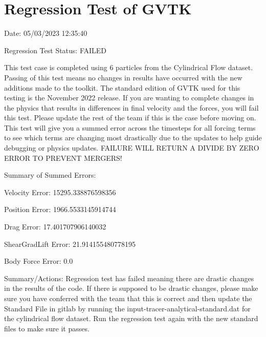 \documentclass{article}
\begin{document}
\section{Regression Test of GVTK}
Date: 05/03/2023 12:35:40

\vspace{5pt}

\noindent Regression Test Status: FAILED

\vspace{5pt}

\noindent This test case is completed using 6 particles from the Cylindrical Flow dataset. Passing of this test means no changes in results have occurred with the new additions made to the toolkit.
The standard edition of GVTK used for this testing is the November 2022 release. If you are wanting to complete changes in the physics that results in differences in final velocity and the forces,
you will fail this test. Please update the rest of the team if this is the case before moving on. This test will give you a summed error across the timesteps for all forcing terms to see which terms
are changing most drastically due to the updates to help guide debugging or physics updates. FAILURE WILL RETURN A DIVIDE BY ZERO ERROR TO PREVENT MERGERS!



\vspace{5pt}

\noindent Summary of Summed Errors:
\vspace{5pt}

Velocity Error: 15295.338876598356

Position Error: 1966.5533145914744

Drag Error: 17.401707906140032

ShearGradLift Error: 21.914155480778195

Body Force Error: 0.0

\vspace{5pt}

\noindent Summary/Actions: Regression test has failed meaning there are drastic changes in the results of the code. 
If there is supposed to be drastic changes, please make sure you have conferred with the team that this is correct and then update the Standard File in gitlab by running the input-tracer-analytical-standard.dat for the cylindrical flow dataset.
Run the regression test again with the new standard files to make sure it passes.

\vspace{5pt}
\end{document}
